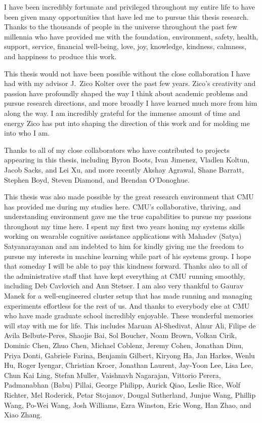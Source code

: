 \documentclass[12pt]{cmuthesis}
\begin{document}
\begin{acknowledgments}
  I have been incredibly fortunate and privileged throughout
  my entire life to have been given many opportunities
  that have led me to pursue this thesis research.
  Thanks to the thousands of people in the universe throughout
  the past few millennia who have provided me with the
  foundation, environment, safety, health, support, service,
  financial well-being, love, joy, knowledge, kindness, calmness,
  and happiness to produce this work.

  This thesis would not have been possible without the close
  collaboration I have had with my advisor J.~Zico Kolter over
  the past few years.
  Zico's creativity and passion have profoundly shaped
  the way I think about academic problems and pursue
  research directions, and more broadly I have learned much
  more from him along the way.
  I am incredibly grateful for the immense
  amount of time and energy Zico has put into shaping the
  direction of this work and for molding me into who I am.

  Thanks to all of my close collaborators who have contributed
  to projects appearing in this thesis, including
  Byron Boots, Ivan Jimenez, Vladlen Koltun, Jacob Sacks, and Lei Xu,
  and more recently
  Akshay Agrawal,
  Shane Barratt,
  Stephen Boyd,
  Steven Diamond,
  and Brendan O'Donoghue.

  This thesis was also made possible by the great research
  environment that CMU has provided me during my studies here.
  CMU's collaborative, thriving, and understanding environment gave
  me the true capabilities to pursue my passions throughout my time here.
  I spent my first two years honing my systems skills working on
  wearable cognitive assistance applications with
  Mahadev (Satya) Satyanarayanan and am
  indebted to him for kindly giving me the freedom to pursue my
  interests in machine learning while part of his systems group.
  I hope that someday I will be able to pay this kindness forward.
  Thanks also to all of the administrative staff that have
  kept everything at CMU running smoothly, including
  Deb Cavlovich and Ann Stetser.
  I am also very thankful to Gaurav Manek for a well-engineered
  cluster setup that has made running and managing
  experiments effortless for the rest of us.
  And thanks to everybody else at CMU who have made
  graduate school incredibly enjoyable.
  These wonderful memories will stay with me for life.
  This includes
  Maruan Al-Shedivat,
  Alnur Ali,
  Filipe de Avila Belbute-Peres,
  Shaojie Bai,
  Sol Boucher,
  Noam Brown,
  Volkan Cirik,
  Dominic Chen,
  Zhuo Chen,
  Michael Coblenz,
  Jeremy Cohen,
  Jonathan Dinu,
  Priya Donti,
  Gabriele Farina,
  Benjamin Gilbert,
  Kiryong Ha,
  Jan Harkes,
  Wenlu Hu,
  Roger Iyengar,
  Christian Kroer,
  Jonathan Laurent,
  Jay-Yoon Lee,
  Lisa Lee,
  Chun Kai Ling,
  Stefan Muller,
  Vaishnavh Nagarajan,
  Vittorio Perera,
  Padmanabhan (Babu) Pillai,
  George Philipp,
  Aurick Qiao,
  Leslie Rice,
  Wolf Richter,
  Mel Roderick,
  Petar Stojanov,
  Dougal Sutherland,
  Junjue Wang,
  Phillip Wang,
  Po-Wei Wang,
  Josh Williams,
  Ezra Winston,
  Eric Wong,
  Han Zhao, and
  Xiao Zhang.


\end{acknowledgments}
\end{document}
